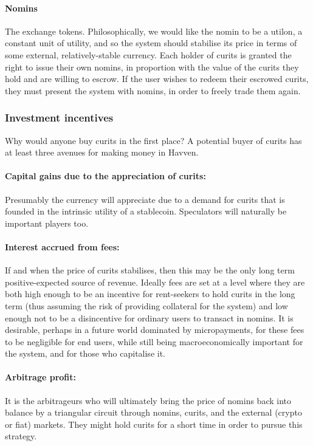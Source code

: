\documentclass{article}
\begin{document}
\paragraph{Nomins} The exchange tokens. Philosophically, we would like the nomin to be a utilon, a constant
unit of utility, and so the system should stabilise its price in terms of some external, relatively-stable
currency. Each holder of curits is granted the right to issue their own nomins, in proportion with the value
of the curits they hold and are willing to escrow. If the user wishes to redeem their escrowed curits,
they must present the system with nomins, in order to freely trade them again.



\subsubsection{Investment incentives}
Why would anyone buy curits in the first place? A potential buyer of curits has at least three avenues for making
money in Havven.

\paragraph{Capital gains due to the appreciation of curits:}
Presumably the currency will appreciate due to a demand for curits that is founded in the intrinsic
utility of a stablecoin. Speculators will naturally be important players too.

\paragraph{Interest accrued from fees:}
If and when the price of curits stabilises, then this may be the only long term positive-expected
source of revenue. Ideally fees are set at a level where they are both high enough to be an incentive
for rent-seekers to hold curits in the long term (thus assuming the risk of providing collateral for
the system) and low enough not to be a disincentive for ordinary users to transact in nomins.
It is desirable, perhaps in a future world dominated by micropayments, for these fees to be
negligible for end users, while still being macroeconomically important for the system, and for those
who capitalise it.

\paragraph{Arbitrage profit:}
It is the arbitrageurs who will ultimately bring the price of nomins back into balance by a triangular circuit
through nomins, curits, and the external (crypto or fiat) markets. They might hold curits for a short time in order
to pursue this strategy.
\end{document}
